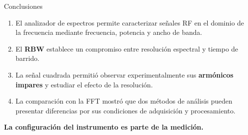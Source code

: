 \documentclass[aspectratio=169]{beamer}
\begin{document}
\begin{frame}{Conclusiones}
\begin{enumerate}
    \item El analizador de espectros permite caracterizar señales RF en el dominio de la frecuencia mediante frecuencia, potencia y ancho de banda.
    \item El \textbf{RBW} establece un compromiso entre resolución espectral y tiempo de barrido.
    \item La señal cuadrada permitió observar experimentalmente sus \textbf{armónicos impares} y estudiar el efecto de la resolución.
    \item La comparación con la FFT mostró que dos métodos de análisis pueden presentar diferencias por sus condiciones de adquisición y procesamiento.
\end{enumerate}
\vfill
\centering
\Large\textbf{La configuración del instrumento es parte de la medición.}
\end{frame}

\backmatter
\end{document}
